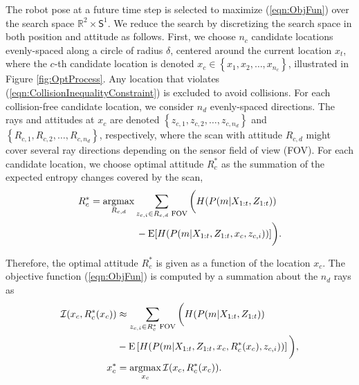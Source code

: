 \documentclass[letterpaper, 10pt, conference]{ieeeconf}
\newcommand{\braces}[1]{\ensuremath{\left\{ #1 \right\}}}
\newcommand{\refeqn}[1]{(\ref{eqn:#1})}
\renewcommand{\Re}{\ensuremath{\mathbb{R}}}
\newcommand{\Sph}{\ensuremath{\mathsf{S}}}
\newcommand{\argmax}{\operatornamewithlimits{argmax}}
\begin{document}
The robot pose at a future time step is selected to maximize \refeqn{ObjFun} over the search space $\Re^2\times\Sph^1$. We reduce the search by discretizing the search space in both position and attitude as follows. First, we choose $n_c$ candidate locations evenly-spaced along a circle of radius $\delta$, centered around the current location $x_t$, where the $c$-th candidate location is denoted $x_c\in\braces{x_1,x_2,\ldots,x_{n_c}}$, illustrated in Figure \ref{fig:OptProcess}. Any location that violates \refeqn{CollisionInequalityConstraint} is excluded to avoid collisions. For each collision-free candidate location, we consider $n_d$ evenly-spaced directions. The rays and attitudes at $x_c$ are denoted $\braces{z_{c,1},z_{c,2},\ldots,z_{c,n_d}}$ and $\braces{R_{c,1},R_{c,2},\ldots,R_{c,n_d}}$, respectively, where the scan with attitude $R_{c,d}$ might cover several ray directions depending on the sensor field of view (FOV). For each candidate location, we choose optimal attitude $R_c^*$ as the summation of the expected entropy changes covered by the scan,
\begin{align}
\label{eqn:FindRc}
&R_c^*=\argmax_{R_{c,d}}\sum_{z_{c,i}\in R_{c,d}\text{ FOV}}\bigg(H(P(m|X_{1:t},Z_{1:t}))\nonumber\\&\qquad\quad\quad\quad\quad-\text{E}[H(P(m|X_{1:t},Z_{1:t},x_c,z_{c,i}))]\bigg).
\end{align}


Therefore, the optimal attitude $R_c^*$ is given as a function of the location $x_c$. The objective function \refeqn{ObjFun} is computed by a summation about the $n_d$ rays as %
\begin{align}
\label{eqn:ObjFunApprox}
\mathcal I(x_c,R_c^*(x_c))&\approx \sum_{z_{c,i}\in R_{c}^*\text{ FOV}}\bigg(H(P(m|X_{1:t},Z_{1:t}))\nonumber\\&-\text{E}\left[H(P(m|X_{1:t},Z_{1:t},x_c,R_c^*(x_c),z_{c,i}))\right]\bigg),
\\
x_c^*&=\argmax_{x_c}\mathcal I(x_c,R_c^*(x_c)).
\end{align}
\end{document}
